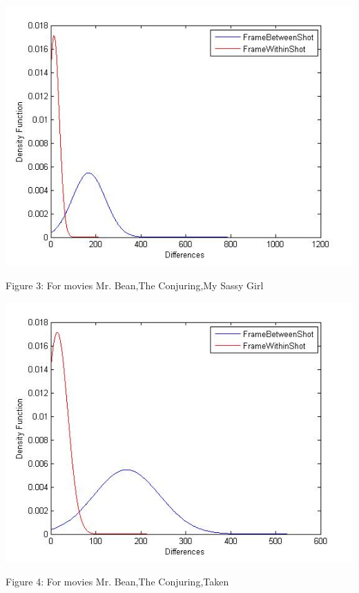 \documentclass[twocolumn,twoside]{article}
\begin{document}
		
		\begin{center}
				\includegraphics[scale=0.4]{taken_97}
		\end{center}
		\vspace{-0.6cm}
		\begin{center}
				{\tiny Figure 3: For movies Mr. Bean,The Conjuring,My Sassy Girl}
		\end{center}
		\begin{center}
				\includegraphics[scale=0.4]{sassy_girl_96}
		\end{center}
		\vspace{-0.6cm}
		\begin{center}
				{\tiny Figure 4: For movies Mr. Bean,The Conjuring,Taken}
		\end{center}
		\vspace{0.3cm}
		
\end{document}
